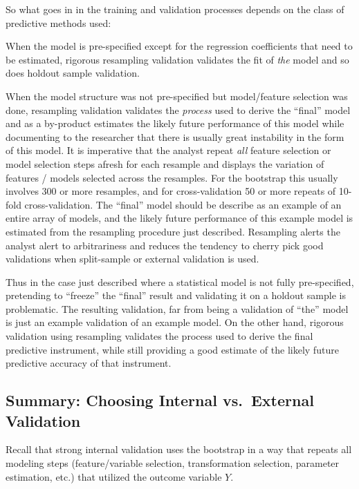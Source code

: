 So what goes in in the training and validation processes depends on
the class of predictive methods used:
\bi
\item When the model is pre-specified except for the regression
  coefficients that need to be estimated, rigorous resampling
  validation validates the fit of \emph{the} model and so does holdout
  sample validation.
\item When the model structure was not pre-specified but model/feature
  selection was done, resampling validation validates the
  \emph{process} used to derive the ``final'' model and as a
  by-product estimates the likely future performance of this model
  while documenting to the researcher that there is usually great
  instability in the form of this model.  It is imperative that the
  analyst repeat \emph{all} feature selection or model selection steps
  afresh for each resample and displays the variation of features /
  models selected across the resamples.  For the bootstrap this
  usually involves 300 or more resamples, and for cross-validation 50
  or more repeats of 10-fold cross-validation.  The ``final'' model
  should be describe as an example of an entire array of models, and
  the likely future performance of this example model is estimated
  from the resampling procedure just described.  Resampling alerts the
  analyst alert to arbitrariness and reduces the tendency to cherry
  pick good validations when split-sample or external validation is used.
\ei

Thus in the case just described where a statistical model is not fully
pre-specified, pretending to ``freeze'' the ``final'' result and
validating it on a holdout sample is problematic.  The resulting
validation, far from being a validation of ``the'' model is just an
example validation of an example model.  On the other hand, rigorous
validation using resampling validates the process used to derive the
final predictive instrument, while still providing a good estimate of
the likely future predictive accuracy of that instrument.

\subsection{Summary: Choosing Internal vs.\ External Validation}\label{reg-choose-val}
Recall that strong internal validation uses the bootstrap in a way
that repeats all modeling steps (feature/variable selection, transformation
selection, parameter estimation, etc.) that utilized the outcome
variable $Y$.

